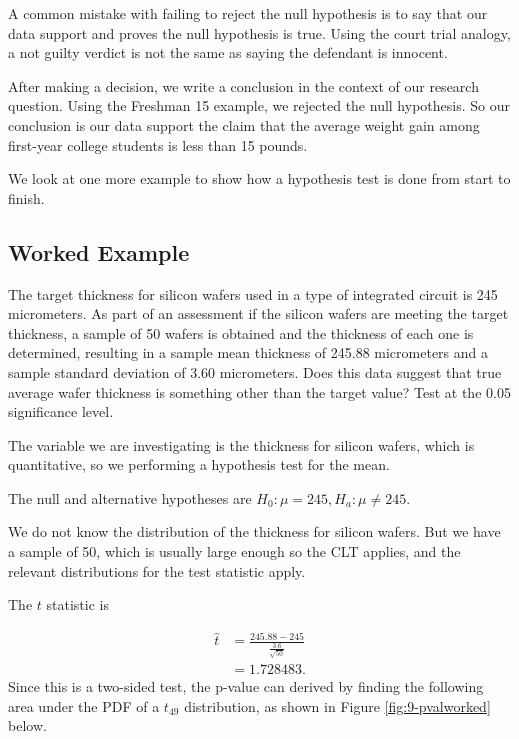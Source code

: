 \documentclass[
]{book}
\begin{document}
A common mistake with failing to reject the null hypothesis is to say that our data support and proves the null hypothesis is true. Using the court trial analogy, a not guilty verdict is not the same as saying the defendant is innocent.

After making a decision, we write a conclusion in the context of our research question. Using the Freshman 15 example, we rejected the null hypothesis. So our conclusion is our data support the claim that the average weight gain among first-year college students is less than 15 pounds.

We look at one more example to show how a hypothesis test is done from start to finish.

\hypertarget{wafer}{%
\subsection{Worked Example}\label{wafer}}

The target thickness for silicon wafers used in a type of integrated circuit is 245 micrometers. As part of an assessment if the silicon wafers are meeting the target thickness, a sample of 50 wafers is obtained and the thickness of each one is determined, resulting in a sample mean thickness of 245.88 micrometers and a sample standard deviation of 3.60 micrometers. Does this data suggest that true average wafer thickness is something other than the target value? Test at the 0.05 significance level.

The variable we are investigating is the thickness for silicon wafers, which is quantitative, so we performing a hypothesis test for the mean.

The null and alternative hypotheses are \(H_0: \mu = 245, H_a: \mu \neq 245\).

We do not know the distribution of the thickness for silicon wafers. But we have a sample of 50, which is usually large enough so the CLT applies, and the relevant distributions for the test statistic apply.

The \(t\) statistic is

\[
\begin{split}
\hat{t} &= \frac{245.88 - 245}{\frac{3.6}{\sqrt{50}}} \\
        &= 1.728483.
\end{split}
\]
Since this is a two-sided test, the p-value can derived by finding the following area under the PDF of a \(t_{49}\) distribution, as shown in Figure \ref{fig:9-pvalworked} below.
\end{document}
